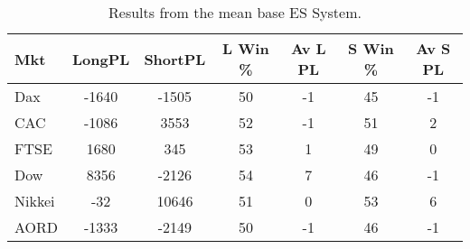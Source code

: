 \begin{table}[ht]
\centering
\caption[Results from the mean base ES System]{Results from the mean base ES System.} 
\label{tab:es_mean_sys}
\begin{tabular}{lcccccc}
  \toprule Mkt & LongPL & ShortPL & L Win \% & Av L PL & S Win \% & Av S PL \\ 
  \midrule Dax & -1640 & -1505 & 50 & -1 & 45 & -1 \\ 
  CAC & -1086 & 3553 & 52 & -1 & 51 & 2 \\ 
  FTSE & 1680 & 345 & 53 & 1 & 49 & 0 \\ 
  Dow & 8356 & -2126 & 54 & 7 & 46 & -1 \\ 
  Nikkei & -32 & 10646 & 51 & 0 & 53 & 6 \\ 
  AORD & -1333 & -2149 & 50 & -1 & 46 & -1 \\ 
   \bottomrule \end{tabular}
\end{table}
